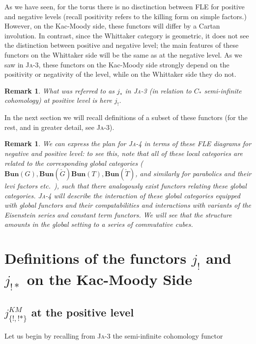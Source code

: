 \documentclass[12pt]{amsart}
\newtheorem{rmk}[thm]{Remark}
\newcommand\Ja[1]{\textsc{Ja}-#1}
\newcommand\Bun{\mathbf{Bun}}
\begin{document}
  As we have seen, for the torus there is no disctinction between FLE for
  positive and negative levels (recall positivity refers to the killing form on
  simple factors.) However, on the Kac-Moody side, these functors will differ by
  a Cartan involution. In contrast, since the Whittaker category is geometric,
  it does not see the distinction between positive and negative level; the main
  features of these functors on the Whittaker side will be the same as at the
  negative level. As we saw in \Ja{3}, these functors on the Kac-Moody
  side strongly depend on the positivity or negativity of the level, while on
  the Whittaker side they do not.\\

  \begin{rmk}
    What was referred to as $j_*$ in \Ja{3} (in relation to $C_*$ semi-infinite
    cohomology) at positive level is here $j_!$.
  \end{rmk}

  In the next section we will recall definitions of a subset of these functors
  (for the rest, and in greater detail, see \Ja{3}).

  \begin{rmk}
    We can express the plan for \Ja{4} in terms of these FLE diagrams for
    negative and positive level: to see this, note that all of these local
    categories are related to the corresponding global categories
    ($\Bun(G),\Bun(\check{G}) \Bun(T),\Bun(\check{T})$, and similarly for
    parabolics and their levi factors etc.\ ), such that there analogously
    exist functors relating these global categories. \Ja{4} will describe the
    interaction of these global categories equipped with global functors and
    their compatabilities and interactions with variants of the Eisenstein
    series and constant term functors. We will see that the structure amounts
    in the global setting to a series of commutative cubes.
  \end{rmk}

\section{Definitions of the functors $j_!$ and $j_{!*}$ on the Kac-Moody Side}
\subsection{$j_{\{!,!*\}}^{KM}$ at the positive level}
Let us begin by recalling from \Ja{3} the
semi-infinite cohomology functor
\end{document}
